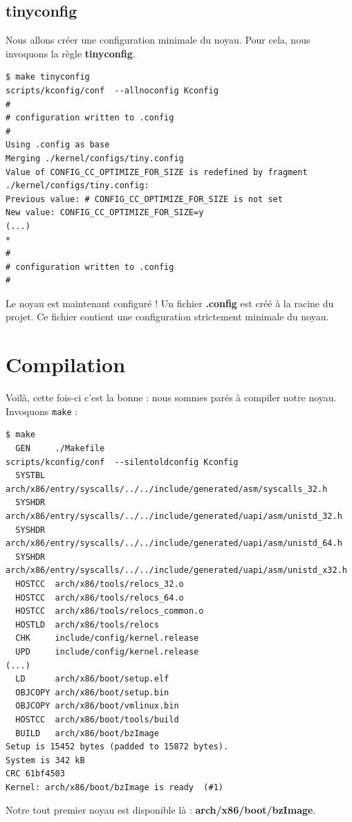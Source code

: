 \documentclass[a4paper]{article}
\begin{document}
\subsection{tinyconfig}

Nous allons créer une configuration minimale du noyau. Pour cela, nous invoquons la règle \textbf{tinyconfig}.

\begin{verbatim}
$ make tinyconfig
scripts/kconfig/conf  --allnoconfig Kconfig
#
# configuration written to .config
#
Using .config as base
Merging ./kernel/configs/tiny.config
Value of CONFIG_CC_OPTIMIZE_FOR_SIZE is redefined by fragment ./kernel/configs/tiny.config:
Previous value: # CONFIG_CC_OPTIMIZE_FOR_SIZE is not set
New value: CONFIG_CC_OPTIMIZE_FOR_SIZE=y
(...)
*
#
# configuration written to .config
#
\end{verbatim}

Le noyau est maintenant configuré ! Un fichier \textbf{.config} est créé à la racine du projet. Ce fichier contient une configuration strictement minimale du noyau.

\section{Compilation}

Voilà, cette fois-ci c'est la bonne : nous sommes parés à compiler notre noyau. Invoquons \lstset{language=sh}\lstinline{make} :\\

\begin{verbatim}
$ make
  GEN     ./Makefile
scripts/kconfig/conf  --silentoldconfig Kconfig
  SYSTBL  arch/x86/entry/syscalls/../../include/generated/asm/syscalls_32.h
  SYSHDR  arch/x86/entry/syscalls/../../include/generated/uapi/asm/unistd_32.h
  SYSHDR  arch/x86/entry/syscalls/../../include/generated/uapi/asm/unistd_64.h
  SYSHDR  arch/x86/entry/syscalls/../../include/generated/uapi/asm/unistd_x32.h
  HOSTCC  arch/x86/tools/relocs_32.o
  HOSTCC  arch/x86/tools/relocs_64.o
  HOSTCC  arch/x86/tools/relocs_common.o
  HOSTLD  arch/x86/tools/relocs
  CHK     include/config/kernel.release
  UPD     include/config/kernel.release
(...)
  LD      arch/x86/boot/setup.elf
  OBJCOPY arch/x86/boot/setup.bin
  OBJCOPY arch/x86/boot/vmlinux.bin
  HOSTCC  arch/x86/boot/tools/build
  BUILD   arch/x86/boot/bzImage
Setup is 15452 bytes (padded to 15872 bytes).
System is 342 kB
CRC 61bf4503
Kernel: arch/x86/boot/bzImage is ready  (#1)
\end{verbatim}

Notre tout premier noyau est disponible là : \textbf{arch/x86/boot/bzImage}.

\clearpage
\listoffigures
\end{document}
